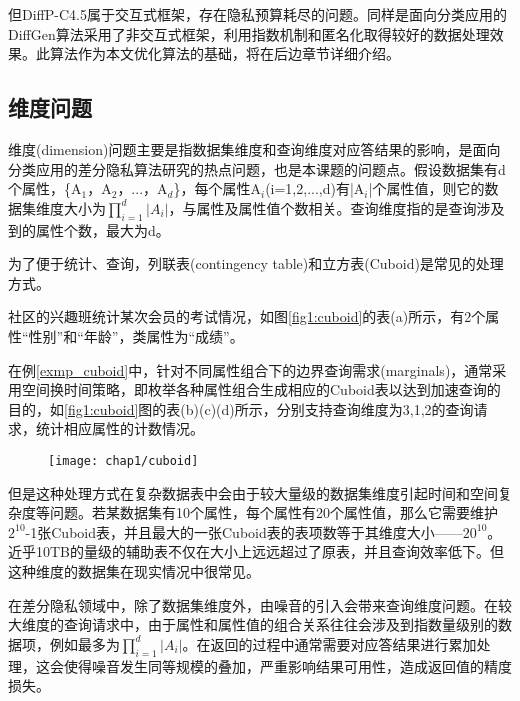 但DiffP-C4.5属于交互式框架，存在隐私预算耗尽的问题。同样是面向分类应用的DiffGen\supercite{DiffGen}算法采用了非交互式框架，利用指数机制和匿名化取得较好的数据处理效果。此算法作为本文优化算法的基础，将在后边章节详细介绍。

\subsection{维度问题}
\label{sec:weidu}
维度(dimension)问题主要是指数据集维度和查询维度对应答结果的影响，是面向分类应用的差分隐私算法研究的热点问题，也是本课题的问题点。假设数据集有d个属性，\{A$_{1}$，A$_{2}$，...，A$_{d}$\}，每个属性A$_{i}$(i=1,2,...,d)有|A$_{i}$|个属性值，则它的数据集维度大小为\(\prod\limits_{i = 1}^d {|A{_i} |}\)，与属性及属性值个数相关。查询维度指的是查询涉及到的属性个数，最大为d。

为了便于统计、查询，列联表(contingency table)\supercite{contingency}和立方表(Cuboid)\supercite{cube}是常见的处理方式。
\begin{exmp}
	\label{exmp_cuboid}
	社区的兴趣班统计某次会员的考试情况，如图\ref{fig1:cuboid}的表(a)所示，有2个属性“性别”和“年龄”，类属性为“成绩”。
\end{exmp}
在例\ref{exmp_cuboid}中，针对不同属性组合下的边界查询需求(marginals)\supercite{marginals}，通常采用空间换时间策略，即枚举各种属性组合生成相应的Cuboid表以达到加速查询的目的，如\ref{fig1:cuboid}图的表(b)(c)(d)所示，分别支持查询维度为3,1,2的查询请求，统计相应属性的计数情况。

\begin{figure}[!htp]
	\centering
	\texttt{[image: chap1/cuboid]}
\end{figure}

但是这种处理方式在复杂数据表中会由于较大量级的数据集维度引起时间和空间复杂度等问题\supercite{sparse_data}。若某数据集有10个属性，每个属性有20个属性值，那么它需要维护$2^{10}$-1张Cuboid表，并且最大的一张Cuboid表的表项数等于其维度大小——$20^{10}$。近乎10TB的量级的辅助表不仅在大小上远远超过了原表，并且查询效率低下。但这种维度的数据集在现实情况中很常见。

在差分隐私领域中，除了数据集维度外，由噪音的引入会带来查询维度问题。在较大维度的查询请求中，由于属性和属性值的组合关系往往会涉及到指数量级别的数据项，例如最多为\(\prod\limits_{i = 1}^d {|A{_i} |}\)。在返回的过程中通常需要对应答结果进行累加处理，这会使得噪音发生同等规模的叠加，严重影响结果可用性，造成返回值的精度损失。

